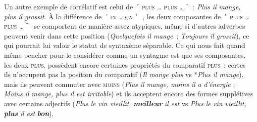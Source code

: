 {    Un autre exemple de corrélatif est celui de \textrm{$⌜$}\textsc{plus} \textsc{…} \textsc{plus} \textsc{…}\textrm{$⌝$} : \textit{Plus il mange, plus il grossit}. À la différence de \textrm{$⌜$}\textsc{ci} \textsc{…} \textsc{ça}\textrm{$⌝$}~, les deux composantes de \textrm{$⌜$}\textsc{plus} \textsc{…} \textsc{plus} \textsc{…}\textrm{$⌝$}~se comportent de manière assez atypiques, même si d’autres adverbes peuvent venir dans cette position (\textit{Quelquefois il mange~}; \textit{Toujours il grossit}), ce qui pourrait lui valoir le statut de syntaxème séparable. Ce qui nous fait quand même pencher pour le considérer comme un syntagme est que ses composantes, les deux \textsc{plus}, possèdent encore certaines propriétés du comparatif \textsc{plus~}: certes ils n’occupent pas la position du comparatif (\textit{Il mange plus} vs *\textit{Plus il mange}), mais ils peuvent commuter avec \textsc{moins} (\textit{Plus il mange, moins il a d’énergie} ; \textit{Moins il mange, plus il est irritable}) et ils acceptent encore des formes supplétives avec certains adjectifs (\textit{Plus le vin vieillit,} \textbf{\textit{meilleur}} \textit{il est} vs \textit{Plus le vin vieillit,} \textbf{\textit{plus}} \textit{il est} \textbf{\textit{bon}}).
}
\largerpage
